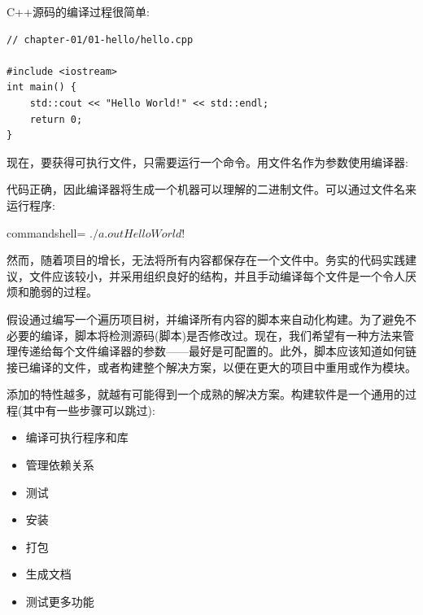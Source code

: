 
C++源码的编译过程很简单:

\begin{lstlisting}[style=styleCXX]
// chapter-01/01-hello/hello.cpp

#include <iostream>
int main() {
	std::cout << "Hello World!" << std::endl;
	return 0;
}
\end{lstlisting}

现在，要获得可执行文件，只需要运行一个命令。用文件名作为参数使用编译器:


代码正确，因此编译器将生成一个机器可以理解的二进制文件。可以通过文件名来运行程序:

\begin{tcblisting}{commandshell={}}
$ ./a.out
Hello World!
$
\end{tcblisting}

然而，随着项目的增长，无法将所有内容都保存在一个文件中。务实的代码实践建议，文件应该较小，并采用组织良好的结构，并且手动编译每个文件是一个令人厌烦和脆弱的过程。


假设通过编写一个遍历项目树，并编译所有内容的脚本来自动化构建。为了避免不必要的编译，脚本将检测源码(脚本)是否修改过。现在，我们希望有一种方法来管理传递给每个文件编译器的参数——最好是可配置的。此外，脚本应该知道如何链接已编译的文件，或者构建整个解决方案，以便在更大的项目中重用或作为模块。

添加的特性越多，就越有可能得到一个成熟的解决方案。构建软件是一个通用的过程(其中有一些步骤可以跳过):

\begin{itemize}
\item 
编译可执行程序和库

\item 
管理依赖关系

\item 
测试

\item 
安装

\item 
打包

\item 
生成文档

\item 
测试更多功能
\end{itemize}

